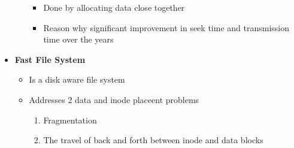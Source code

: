 \documentclass[12pt]{article}
\begin{document}
\begin{itemize}
\begin{itemize}
        \begin{itemize}
            \item Done by allocating data close together
            \item Reason why significant improvement in seek time and transmission time over the years
        \end{itemize}
    \end{itemize}
    \item \textbf{Fast File System}
    \begin{itemize}
        \item Is a disk aware file system
        \item Addresses 2 data and inode placeent problems
        \begin{enumerate}[1.]
            \item Fragmentation
            \item The travel of back and forth between inode and data blocks
        \end{enumerate}
    \end{itemize}
\end{itemize}
\end{document}
